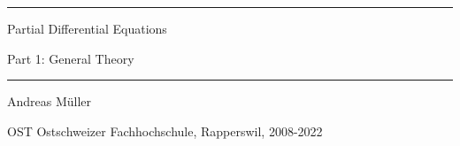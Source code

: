 \documentclass[a4paper,12pt]{book}
\begin{document}
\pagestyle{fancy}
\lhead{}
\rhead{}
\frontmatter
\newcommand\HRule{\noindent\rule{\linewidth}{1.5pt}}
\begin{titlepage}
\HRule
\vspace*{10pt}
\begin{flushright}
{\Huge
Partial Differential Equations}
\end{flushright}
\begin{flushright}
{\Large Part 1: General Theory}
\end{flushright}
\HRule
\begin{flushright}
\vspace{30pt}
\LARGE
Andreas Müller
\end{flushright}
\begin{center}
OST Ostschweizer Fachhochschule, Rapperswil, 2008-2022
\end{center}
\end{titlepage}
\hypersetup{
    colorlinks=true,
    linktoc=all,
    linkcolor=blue
}
\tableofcontents
\newtheorem{satz}{Theorem}[chapter]
\newtheorem{problem}[satz]{Problem}
\newtheorem{hilfssatz}[satz]{Lemma}
\newtheorem{definition}[satz]{Definition}
\newtheorem{annahme}[satz]{Assumption}
\newtheorem{aufgabe}[satz]{Task}
\newenvironment{beispiel}[1][Example]{%
\begin{proof}[#1]%
\renewcommand{\qedsymbol}{$\bigcirc$}
}{\end{proof}}
\allowdisplaybreaks
\mainmatter










%
\appendix

\vfill
\pagebreak
\ifodd\value{page}\else\null\clearpage\fi
{}
\rhead{}
\label{chapter:index}

\end{document}
